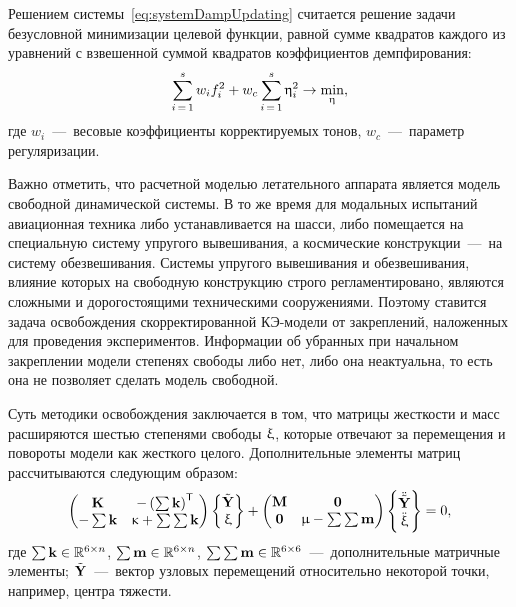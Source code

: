 Решением системы~\eqref{eq:systemDampUpdating} считается решение задачи безусловной минимизации целевой функции, равной сумме квадратов каждого из уравнений с взвешенной суммой квадратов коэффициентов демпфирования:
\begin{equation}
	\sum \limits_{i\,=\,1} ^ s w_i f_i ^ 2 + w_c \sum \limits_{i\,=\,1}^s \upeta_i ^ 2 \rightarrow \min_{\mathbf{\upeta}},
	\label{eq:objFinalDampFunUpdating}
\end{equation}
где $ w_i $~---~весовые коэффициенты корректируемых тонов, $ w_c $~---~параметр регуляризации.

Важно отметить, что расчетной моделью летательного аппарата является модель свободной динамической системы. В то же время для модальных испытаний авиационная техника либо устанавливается на шасси, либо помещается на специальную систему упругого вывешивания, а космические конструкции~---~на систему обезвешивания. Системы упругого вывешивания и обезвешивания, влияние которых на свободную конструкцию строго регламентировано, являются сложными и дорогостоящими техническими сооружениями. Поэтому ставится задача освобождения скорректированной КЭ-модели от закреплений, наложенных для проведения экспериментов. Информации об убранных при начальном закреплении модели степенях свободы либо нет, либо она неактуальна, то есть она не позволяет сделать модель свободной.

Суть методики освобождения заключается в том, что матрицы жесткости и масс расширяются шестью степенями свободы $ \mathbf{\upxi} $, которые отвечают за перемещения и повороты модели как жесткого целого. Дополнительные элементы матриц рассчитываются следующим образом:
\begin{equation}
	\begin{pmatrix}
		\mathbf{K} & -\left( \sum \mathbf{k} \right) ^ \mathsf{T} \\
		 -\sum \mathbf{k} & \upkappa + \sum \sum \mathbf{k}
	\end{pmatrix}
	\begin{Bmatrix}
		\tilde{\mathbf{Y}} \\
		\upxi
	\end{Bmatrix}
	+
	\begin{pmatrix}
		\mathbf{M} & \mathbf{0} \\
		\mathbf{0} & \upmu - \sum \sum \mathbf{m}
	\end{pmatrix}
		\begin{Bmatrix}
		\ddot{\tilde{\mathbf{Y}}} \\
		\ddot{\upxi}
	\end{Bmatrix}
	= 0,
\end{equation}
где $ \sum \mathbf{k} \in \mathbb{R}^{6 \times n}$, $ \sum \mathbf{m} \in \mathbb{R}^{6 \times n}$, $ \sum \sum \mathbf{m} \in \mathbb{R}^{6 \times 6} $~---~дополнительные матричные элементы; $ \tilde{\mathbf{Y}} $~---~вектор узловых перемещений относительно некоторой точки, например, центра тяжести.


